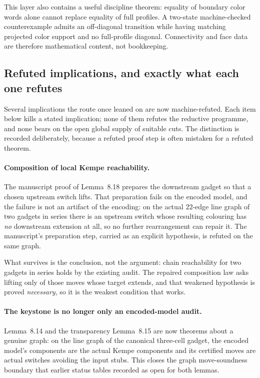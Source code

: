 \documentclass[11pt]{article}
\theoremstyle{definition}
\begin{document}
This layer also contains a useful discipline theorem: equality of boundary
color words alone cannot replace equality of full profiles.  A two-state
machine-checked counterexample admits an off-diagonal transition while having
matching projected color support and no full-profile diagonal.  Connectivity
and face data are therefore mathematical content, not bookkeeping.

\subsection{Refuted implications, and exactly what each one refutes}

Several implications the route once leaned on are now machine-refuted.  Each
item below kills a stated implication; none of them refutes the reductive
programme, and none bears on the open global supply of suitable cuts.  The
distinction is recorded deliberately, because a refuted proof step is often
mistaken for a refuted theorem.

\paragraph{Composition of local Kempe reachability.}  The manuscript proof of
Lemma~8.18 prepares the downstream gadget so that a chosen upstream switch
lifts.  That preparation fails on the encoded model, and the failure is not an
artifact of the encoding: on the actual $22$-edge line graph of two gadgets in
series there is an upstream switch whose resulting colouring has \emph{no}
downstream extension at all, so no further rearrangement can repair it.  The
manuscript's preparation step, carried as an explicit hypothesis, is refuted on
the same graph.

What survives is the conclusion, not the argument: chain reachability for two
gadgets in series holds by the existing audit.  The repaired composition law
asks lifting only of those moves whose target extends, and that weakened
hypothesis is proved \emph{necessary}, so it is the weakest condition that
works.

\paragraph{The keystone is no longer only an encoded-model audit.}  Lemma~8.14
and the transparency Lemma~8.15 are now theorems about a genuine graph: on the
line graph of the canonical three-cell gadget, the encoded model's components
are the actual Kempe components and its certified moves are actual switches
avoiding the input stubs.  This closes the graph move-soundness boundary that
earlier status tables recorded as open for both lemmas.
\end{document}
